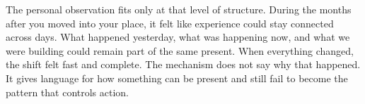 The personal observation fits only at that level of structure. During the months after you moved into your place, it felt like experience could stay connected across days. What happened yesterday, what was happening now, and what we were building could remain part of the same present. When everything changed, the shift felt fast and complete. The mechanism does not say why that happened. It gives language for how something can be present and still fail to become the pattern that controls action.
